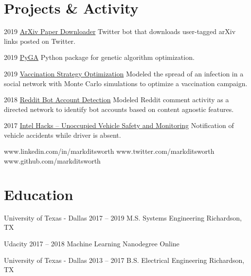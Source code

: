 \documentclass{tccv}
\begin{document}
\section{Projects \& Activity}
\begin{yearlist}
	
	\item{2019}
	{\href{https://github.com/markditsworth/PaperDownload}{ArXiv Paper Downloader}}
	{Twitter bot that downloads user-tagged arXiv links posted on Twitter.}
	
	\item{2019}
	{\href{https://github.com/markditsworth/PyGA}{PyGA}}
	{Python package for genetic algorithm optimization.}
	
	\item{2019}
	{\href{https://towardsdatascience.com/infection-modeling-part-1-87e74645568a}{Vaccination Strategy Optimization}}
	{Modeled the spread of an infection in a social network with Monte Carlo simulations to optimize a vaccination campaign.}
	
	\item{2018}
	{\href{https://chatbotslife.com/bot-detection-with-network-science-dde6525005f2}{Reddit Bot Account Detection}}
	{Modeled Reddit comment activity as a directed network to identify bot accounts based on content agnostic features.}
	
	\item{2017}
	{\href{https://devpost.com/software/unoccupied-vehicle-safety-and-monitoringg}{Intel Hacks -- Unoccupied Vehicle Safety and Monitoring}}
	{Notification of vehicle accidents while driver is absent.}
	
\end{yearlist}

    {www.linkedin.com/in/markditsworth}
    {www.twitter.com/markditsworth}
    {www.github.com/markditsworth}

\section{Education}

\begin{yearlist}

\item[University of Texas - Dallas]{2017 -- 2019}
     {M.S. Systems Engineering}
     {Richardson, TX}
     
\item[Udacity]{2017 -- 2018}
	 {Machine Learning Nanodegree}
	 {Online}

\item[University of Texas - Dallas]{2013 -- 2017}
     {B.S. Electrical Engineering}
     {Richardson, TX}

\end{yearlist}
\end{document}
